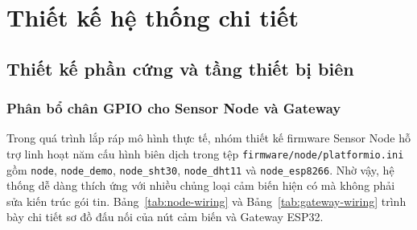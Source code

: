\section{Thiết kế hệ thống chi tiết}
\label{sec:c3-detailed}

\setcounter{secnumdepth}{3}

\subsection{Thiết kế phần cứng và tầng thiết bị biên}
\label{subsec:c3-hardware}

\subsubsection{Phân bổ chân GPIO cho Sensor Node và Gateway}

Trong quá trình lắp ráp mô hình thực tế, nhóm thiết kế firmware Sensor Node hỗ trợ linh hoạt năm cấu hình biên dịch trong tệp \texttt{firmware/node/platformio.ini} gồm \texttt{node}, \texttt{node\_demo}, \texttt{node\_sht30}, \texttt{node\_dht11} và \texttt{node\_esp8266}. Nhờ vậy, hệ thống dễ dàng thích ứng với nhiều chủng loại cảm biến hiện có mà không phải sửa kiến trúc gói tin. Bảng~\ref{tab:node-wiring} và Bảng~\ref{tab:gateway-wiring} trình bày chi tiết sơ đồ đấu nối của nút cảm biến và Gateway ESP32.


